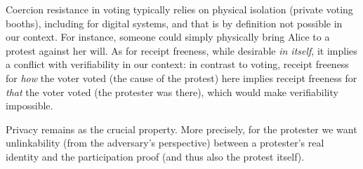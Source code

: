 Coercion resistance in voting typically relies on physical isolation
(\eg private voting booths), including for digital systems, and that is by 
definition not possible in our context.
For instance, someone could simply physically bring Alice to a protest against her will.
As for receipt freeness, while
desirable \emph{in itself}, it implies a conflict with verifiability in our context:
in contrast to voting, receipt freeness for \emph{how} the voter voted (\ie the 
cause of the protest) here implies receipt freeness for \emph{that} the voter voted 
(\ie the protester was there), which would make verifiability impossible.

Privacy remains as the crucial property.
More precisely, for the protester we want unlinkability (from the adversary's 
perspective) between a protester's real identity and the participation proof 
(and thus also the protest itself).

